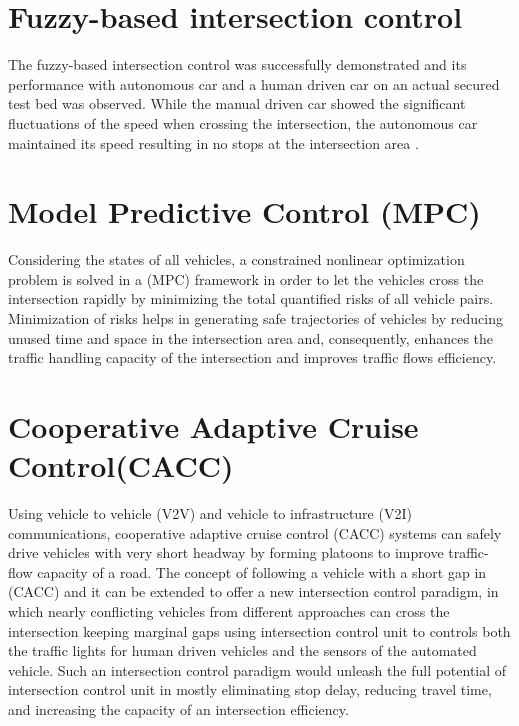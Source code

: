 \documentclass{book}
\begin{document}
\section{Fuzzy-based intersection control} The fuzzy-based intersection control was successfully demonstrated and its
performance with autonomous car and a human driven
car on an actual secured test bed was observed. While the manual
driven car showed the significant fluctuations of the speed when
crossing the intersection, the autonomous car maintained its
speed resulting in no stops at the intersection area \cite{milanes2010controller,
ferreira2015methods, how2008real,braid2007terramax,litman2017autonomous}.

\section{Model Predictive Control (MPC)}
Considering the states of all vehicles, a constrained nonlinear optimization problem is solved in a (MPC) framework in order to let the vehicles cross the intersection rapidly by minimizing the total quantified risks of all vehicle pairs. Minimization of risks helps in generating safe trajectories of vehicles by reducing unused time and space in the intersection area and, consequently, enhances the traffic handling capacity of the intersection and improves traffic flows efficiency.\cite{kamal2015vehicle}
\section{Cooperative Adaptive Cruise Control(CACC)}
Using vehicle to vehicle (V2V) and vehicle to infrastructure (V2I) communications, cooperative adaptive cruise control (CACC) systems can safely drive vehicles with very short headway by forming platoons to improve traffic-flow capacity of a road. The concept of following a vehicle with a short gap in (CACC) and it can be extended to offer a new intersection control paradigm, in which nearly conflicting vehicles from different approaches can cross the intersection keeping marginal gaps using intersection control unit to controls both the traffic lights for human driven vehicles and the sensors of the automated vehicle. Such an intersection control paradigm would unleash the full potential of intersection control unit in mostly eliminating stop delay, reducing travel time, and increasing the capacity of an intersection efficiency. \cite{van2006impact,ploeg2011connect,omae2010automatic}
\end{document}
